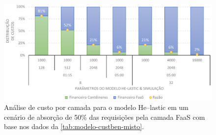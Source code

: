 \documentclass[english,brazilian]{UNISINOSmonografia} %
\newcommand\defaultFigureWidth{0.9}
\begin{document}
\begin{figure}[tb]
	\centering%
	\begin{minipage}{\defaultFigureWidth\textwidth}
		\caption[Análise de custo por camada para o modelo \textsf{He}--lastic em um cenário de absorção de 50\% das requisições pela camada FaaS]{Análise de custo por camada para o modelo \textsf{He}--lastic em um cenário de absorção de 50\% das requisições pela camada FaaS com base nos dados da \autoref{tab:modelo-custben-misto}.}
		\label{fig:modelo-custben-misto}
		\vspace{1ex}
		\includegraphics[width=\textwidth]{modelo-custben-misto}
	\end{minipage}
\end{figure}
\end{document}
